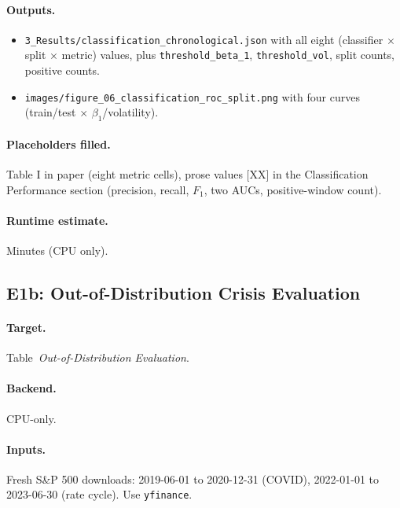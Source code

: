 \documentclass[11pt]{article}
\begin{document}
\paragraph*{Outputs.}
\begin{itemize}[leftmargin=*]
  \item \texttt{3\_Results/classification\_chronological.json} with
        all eight (classifier $\times$ split $\times$ metric) values,
        plus \texttt{threshold\_beta\_1}, \texttt{threshold\_vol},
        split counts, positive counts.
  \item \texttt{images/figure\_06\_classification\_roc\_split.png} with
        four curves (train/test $\times$ $\beta_1$/volatility).
\end{itemize}

\paragraph*{Placeholders filled.} Table I in paper (eight metric
cells), prose values [XX] in the Classification Performance section
(precision, recall, $F_1$, two AUCs, positive-window count).

\paragraph*{Runtime estimate.} Minutes (CPU only).

\subsection{E1b: Out-of-Distribution Crisis Evaluation}

\paragraph*{Target.} Table~\emph{Out-of-Distribution Evaluation}.

\paragraph*{Backend.} CPU-only.

\paragraph*{Inputs.} Fresh S\&P 500 downloads:
2019-06-01 to 2020-12-31 (COVID), 2022-01-01 to 2023-06-30 (rate
cycle). Use \texttt{yfinance}.
\end{document}
